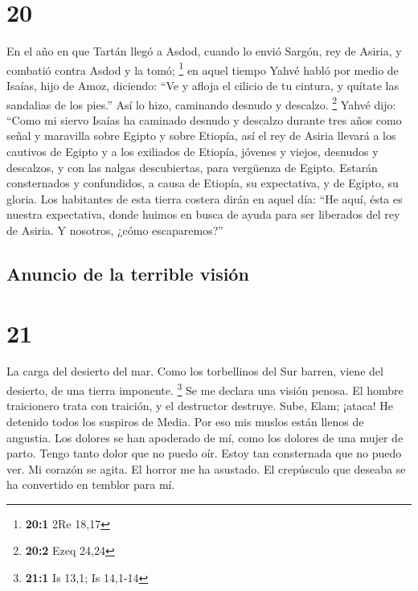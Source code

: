 \hypertarget{section-19}{%
\section{20}\label{section-19}}

 En el año en que Tartán llegó a Asdod, cuando lo envió
Sargón, rey de Asiria, y combatió contra Asdod y la tomó; \footnote{\textbf{20:1}
  2Re 18,17}  en aquel tiempo Yahvé habló por medio de
Isaías, hijo de Amoz, diciendo: ``Ve y afloja el cilicio de tu cintura,
y quítate las sandalias de los pies.'' Así lo hizo, caminando desnudo y
descalzo. \footnote{\textbf{20:2} Ezeq 24,24}  Yahvé dijo:
``Como mi siervo Isaías ha caminado desnudo y descalzo durante tres años
como señal y maravilla sobre Egipto y sobre Etiopía,  así
el rey de Asiria llevará a los cautivos de Egipto y a los exiliados de
Etiopía, jóvenes y viejos, desnudos y descalzos, y con las nalgas
descubiertas, para vergüenza de Egipto.  Estarán
consternados y confundidos, a causa de Etiopía, su expectativa, y de
Egipto, su gloria.  Los habitantes de esta tierra costera
dirán en aquel día: ``He aquí, ésta es nuestra expectativa, donde huimos
en busca de ayuda para ser liberados del rey de Asiria. Y nosotros,
¿cómo escaparemos?''

\hypertarget{anuncio-de-la-terrible-visiuxf3n}{%
\subsection{Anuncio de la terrible
visión}\label{anuncio-de-la-terrible-visiuxf3n}}

\hypertarget{section-20}{%
\section{21}\label{section-20}}

 La carga del desierto del mar. Como los torbellinos del
Sur barren, viene del desierto, de una tierra imponente. \footnote{\textbf{21:1}
  Is 13,1; Is 14,1-14}  Se me declara una visión penosa.
El hombre traicionero trata con traición, y el destructor destruye.
Sube, Elam; ¡ataca! He detenido todos los suspiros de Media.
 Por eso mis muslos están llenos de angustia. Los dolores
se han apoderado de mí, como los dolores de una mujer de parto. Tengo
tanto dolor que no puedo oír. Estoy tan consternada que no puedo ver.
 Mi corazón se agita. El horror me ha asustado. El
crepúsculo que deseaba se ha convertido en temblor para mí.


